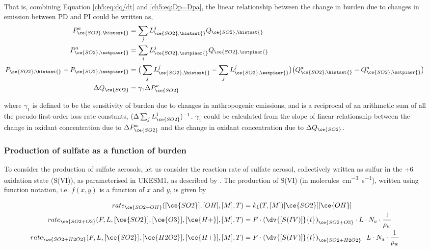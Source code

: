 That is, combining Equation \ref{ch5:eq:dq/dt} and \ref{ch5:eq:Dp=Dpa}, the linear relationship between the change in  burden due to changes in emission between PD and PI could be written as, 
\begin{align}
    P_{\ce{SO2},\histsst{}}^a &= \sum_j L_{\ce{SO2},\histsst{}}^j Q_{\ce{SO2},\histsst{}} \\
    P_{\ce{SO2},\sstpiaer{}}^a &= \sum_j L_{\ce{SO2},\sstpiaer{}}^j Q_{\ce{SO2},\sstpiaer{}} \\
    P_{\ce{SO2},\histsst{}} - P_{\ce{SO2},\sstpiaer{}} &= \big(\sum_j L_{\ce{SO2},\histsst{}}^j - \sum_j L_{\ce{SO2},\sstpiaer{}}^j\big)  \big(Q_{\ce{SO2},\histsst{}}^a - Q_{\ce{SO2},\sstpiaer{}}^a\big) \\
    \Delta Q_{\ce{SO2}} &= \gamma_1 \Delta P_{\ce{SO2}}^a
\end{align}

where $\gamma_1$ is defined to be the sensitivity of  burden due to changes in anthropogenic emissions, and is a reciprocal of an arithmetic sum of all the pseudo first-order loss rate constants, $(\Delta\sum_j L_{\ce{SO2}}^j)^{-1}$. $\gamma_1$ could be calculated from the slope of linear relationship between the change in oxidant concentration due to $\Delta P_{\ce{SO2}}^a$ and the change in oxidant concentration due to $\Delta Q_{\ce{SO2}}$.

\subsubsection*{Production of sulfate as a function of  burden}

To consider the production of sulfate aerosols, let us consider the reaction rate of sulfate aerosol, collectively written as sulfur in the +6 oxidation state (S(VI)), as parameterised in UKESM1, as described by \citet{mannDescriptionEvaluationGLOMAPmode2010}. The production of S(VI) (in \unit{molecules~cm^{−3}~s^{−1}}), written using function notation, i.e. $f(x,y)$ is a function of $x$ and $y$, is given by

\begin{align}
    rate_{\ce{SO2 + OH}}([\ce{SO2}],[OH],[M],T) &= k_1(T,[M])[\ce{SO2}][\ce{OH}] \\
    rate_{\ce{SO2 + O3}}(F,L,[\ce{SO2}],[\ce{O3}], [\ce{H+}],[M],T) &= F \cdot \left( \dv{[S(IV)]}{t}\right)_{\ce{SO2 + O3}} \cdot L \cdot N_a \cdot \frac{1}{\rho_w}\\
    rate_{\ce{SO2 + H2O2}}(F,L,[\ce{SO2}],[\ce{H2O2}], [\ce{H+}],[M],T) &= F \cdot \left( \dv{[S(IV)]}{t}\right)_{\ce{SO2 + H2O2}} \cdot L \cdot N_a \cdot \frac{1}{\rho_w}
\end{align}


